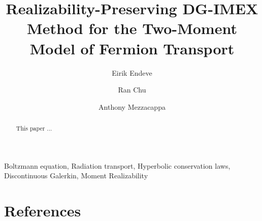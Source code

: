 \documentclass[review]{elsarticle}
\begin{document}
\begin{frontmatter}

\title{Realizability-Preserving DG-IMEX Method for the Two-Moment Model of Fermion Transport }

\author[ornl,utk-phys]{Eirik Endeve}

\author[utk-phys]{Ran Chu}

\author[utk-phys]{Anthony Mezzacappa}



\address[ornl]{Computational and Applied Mathematics Group,
Oak Ridge National Laboratory,
Oak Ridge, TN 37831 USA }

\address[utk-phys]{Department of Physics and Astronomy,
University of Tennessee
Knoxville, TN 37996-1200}

\begin{abstract}
This paper ...
\end{abstract}

\begin{keyword}
Boltzmann equation, 
Radiation transport, 
Hyperbolic conservation laws, 
Discontinuous Galerkin, 
Moment Realizability
\end{keyword}

\end{frontmatter}

\tableofcontents

\linenumbers










%
\clearpage


\section*{References}


\end{document}
